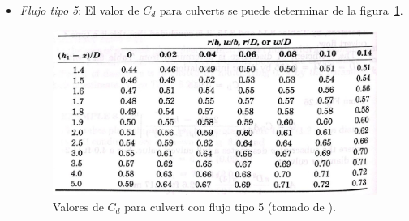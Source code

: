 \documentclass[11pt, oneside]{article}
\begin{document}
\begin{itemize}
\item \emph{Flujo tipo 5}: El valor de $C_d$ para culverts se puede determinar de la figura~\ref{fig822}.
\begin{figure}[h]
    \centering
    \includegraphics[width=0.8\linewidth]{fig822.jpeg}
    \caption{Valores de $C_d$ para culvert con flujo tipo 5 (tomado de \cite{French}).}
    \label{fig822}
\end{figure}

\end{itemize}


\end{document}
